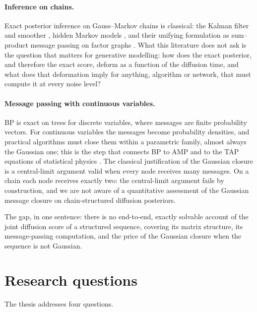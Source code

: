 \paragraph{Inference on chains.} Exact posterior inference on
Gauss--Markov chains is classical: the Kalman filter and smoother
\citep{kalman1960new, rauch1965maximum}, hidden Markov models
\citep{rabiner1989tutorial}, and their unifying formulation as
sum--product message passing on factor graphs
\citep{kschischang2001factor, mezard2009information}. What this
literature does not ask is the question that matters for generative
modelling: how does the exact posterior, and therefore the exact score,
deform as a function of the diffusion time, and what does that
deformation imply for anything, algorithm or network, that must compute
it at every noise level?

\paragraph{Message passing with continuous variables.} BP is exact on
trees for discrete variables, where messages are finite probability
vectors. For continuous variables the messages become probability
densities, and practical algorithms must close them within a parametric
family, almost always the Gaussian one; this is the step that connects
BP to AMP and to the TAP equations of statistical physics
\citep{thouless1977solution, donoho2009message, zdeborova2016statistical,
genovese2026amp}. The classical justification of the Gaussian closure is
a central-limit argument valid when every node receives many messages.
On a chain each node receives exactly two: the central-limit argument
fails by construction, and we are not aware of a quantitative assessment
of the Gaussian message closure on chain-structured diffusion
posteriors.

The gap, in one sentence: there is no end-to-end, exactly solvable
account of the joint diffusion score of a structured sequence, covering
its matrix structure, its message-passing computation, and the price of
the Gaussian closure when the sequence is not Gaussian.

\section{Research questions}\label{sec:rq}

The thesis addresses four questions.

